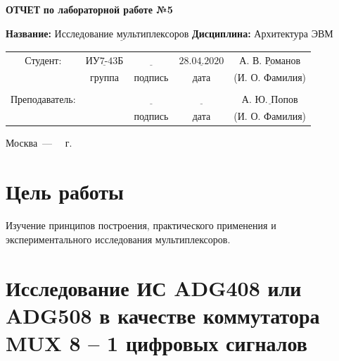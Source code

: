 \documentclass[a4paper,12pt]{article}
\begin{document}
\begin{center}
	\noindent\begin{minipage}{1.3\textwidth}\centering
	\Large\textbf{  ОТЧЕТ }\newline
	\textbf{по лабораторной работе №5}\newline\newline
	\end{minipage}
\end{center}

\noindent\textbf{Название:} $\underline{\text{Исследование мультиплексоров}}$\newline\newline
\noindent\textbf{Дисциплина:} $\underline{\text{Архитектура ЭВМ}}$\newline\newline\newline\newline\newline

\begin{center}
	\begin{tabular}{ccccc}
		Студент: & $\underline{\text{ИУ7-43Б}}$ & $\underline{\text{~~~~~~~~~~~}}$ & $\underline{\text{28.04.2020}}$ & $\underline{\text{А. В. Романов}}$ \\
		 & \footnotesize группа & \footnotesize подпись & \footnotesize дата  & \footnotesize (И. О. Фамилия) \\
		  &  &  &  & \\
		Преподаватель: & \textbf{} & $\underline{\text{~~~~~~~~~~~}}$ & $\underline{\text{~~~~~~~~~~~~}}$ & $\underline{\text{А. Ю. Попов}}$ \\
		&  & \footnotesize подпись & \footnotesize дата  & \footnotesize (И. О. Фамилия) \\
	\end{tabular}
\end{center}


\begin{center}
	\vfill
	Москва~---~\the\year
~г.
\end{center}
\clearpage

\section{Цель работы} Изучение принципов построения, практического применения и экспериментального исследования мультиплексоров.

\section{Исследование ИС ADG408 или ADG508 в качестве коммутатора MUX 8 – 1 цифровых сигналов}
\end{document}
